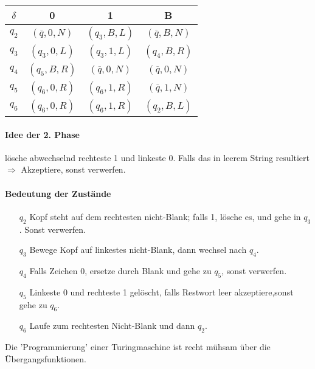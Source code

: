 \begin{table}[htb!]
\centering
\begin{tabular}{c|c c c}
$\delta$ & 0 & 1 & B \\
\hline
$q_2$ & $(\overline{q},0,N)$ & $(q_3,B,L)$ & $(\overline{q},B,N)$ \\
$q_3$ & $(q_3,0,L)$ & $(q_3,1,L)$ & $(q_4,B,R)$ \\
$q_4$ & $(q_5,B,R)$ & $(\overline{q},0,N)$ & $(\overline{q},0,N)$ \\
$q_5$ & $(q_6,0,R)$ & $(q_6,1,R)$ & $(\overline{q},1,N)$ \\
$q_6$ & $(q_6,0,R)$ & $(q_6,1,R)$ & $(q_2,B,L)$ \\
\end{tabular}
\end{table}

\paragraph*{Idee der 2. Phase} lösche abwechselnd rechteste 1 und linkeste 0. Falls das in leerem String resultiert $\Rightarrow$ Akzeptiere, sonst verwerfen.

\paragraph*{Bedeutung der Zustände}
\begin{itemize}
	\item[$q_2$] Kopf steht auf dem rechtesten nicht-Blank; falls 1, lösche es, und gehe in $q_3$. Sonst verwerfen.
	\item[$q_3$] Bewege Kopf auf linkestes nicht-Blank, dann wechsel nach $q_4$.
	\item[$q_4$] Falls Zeichen 0, ersetze durch Blank und gehe zu $q_5$, sonst verwerfen.
	\item[$q_5$] Linkeste 0 und rechteste 1 gelöscht, falls Restwort leer akzeptiere,sonst gehe zu $q_6$.
	\item[$q_6$] Laufe zum rechtesten Nicht-Blank und dann $q_2$.
\end{itemize}

\par\medskip Die 'Programmierung' einer Turingmaschine ist recht mühsam über die Übergangsfunktionen.

